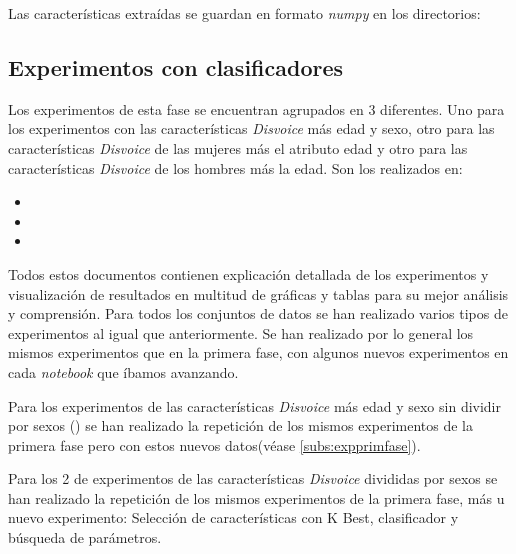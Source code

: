 Las características extraídas se guardan en formato \textit{numpy} en los directorios: 

\subsection{Experimentos con clasificadores}
Los experimentos de esta fase se encuentran agrupados en 3  diferentes. Uno para los experimentos con las características \textit{Disvoice} más edad y sexo, otro para las características \textit{Disvoice} de las mujeres más el atributo edad y otro para las características \textit{Disvoice} de los hombres más la edad. Son los realizados en:
\begin{itemize}
\item {}
\item {}
\item {}
\end{itemize} 
Todos estos documentos contienen explicación detallada de los experimentos y visualización de resultados en multitud de gráficas y tablas para su mejor análisis y comprensión. Para todos los conjuntos de datos se han realizado varios tipos de experimentos al igual que anteriormente. Se han realizado por lo general los mismos experimentos que en la primera fase, con algunos nuevos experimentos en cada \textit{notebook} que íbamos avanzando.

Para los experimentos de las características \textit{Disvoice} más edad y sexo sin dividir por sexos () se han realizado la repetición de los mismos experimentos de la primera fase pero con estos nuevos datos(véase \ref{subs:expprimfase}).

Para los 2  de experimentos de las características \textit{Disvoice} divididas por sexos se han realizado la repetición de los mismos experimentos de la primera fase, más u nuevo experimento: Selección de características con K Best, clasificador  y búsqueda de parámetros.



